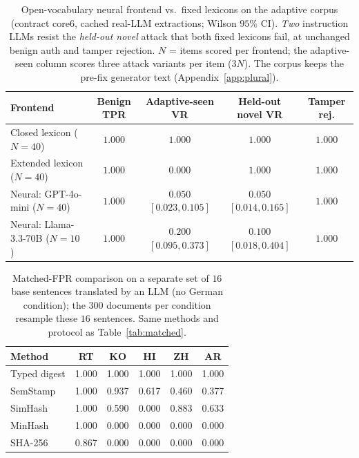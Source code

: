\documentclass[11pt]{article}
\begin{document}
\begin{table}[t]
\centering
\caption{Open-vocabulary neural frontend vs.\ fixed lexicons on the adaptive
corpus (contract core6, cached real-LLM extractions; Wilson $95\%$ CI). \emph{Two}
instruction LLMs resist the \emph{held-out novel} attack that both fixed lexicons
fail, at unchanged benign auth and tamper rejection. $N$ = items scored per
frontend; the adaptive-seen column scores three attack variants per item ($3N$). The corpus keeps the pre-fix generator text (Appendix~\ref{app:plural}).}
\label{tab:neuraldefense}
\footnotesize
\begin{tabular}{lcccc}
\toprule
Frontend & Benign TPR & Adaptive-seen VR & Held-out novel VR & Tamper rej. \\
\midrule
Closed lexicon ($N{=}40$)         & $1.000$ & $1.000$ & $1.000$ & $1.000$ \\
Extended lexicon ($N{=}40$)       & $1.000$ & $0.000$ & $1.000$ & $1.000$ \\
Neural: GPT-4o-mini ($N{=}40$)    & $1.000$ & $0.050$ $[0.023,0.105]$ & $0.050$ $[0.014,0.165]$ & $1.000$ \\
Neural: Llama-3.3-70B ($N{=}10$)  & $1.000$ & $0.200$ $[0.095,0.373]$ & $0.100$ $[0.018,0.404]$ & $1.000$ \\
\bottomrule
\end{tabular}
\end{table}

\begin{table}[t]
\centering
\caption{Matched-FPR comparison on a separate set of $16$ base sentences
translated by an LLM (no German condition); the $300$ documents per condition
resample these $16$ sentences. Same methods and protocol as Table~\ref{tab:matched}.}
\label{tab:matched16}
\footnotesize
\begin{tabular}{@{}lccccc@{}}
\toprule
Method & RT & KO & HI & ZH & AR \\
\midrule
Typed digest   & 1.000 & 1.000 & 1.000 & 1.000 & 1.000 \\
SemStamp       & 1.000 & 0.937 & 0.617 & 0.460 & 0.377 \\
SimHash        & 1.000 & 0.590 & 0.000 & 0.883 & 0.633 \\
MinHash        & 1.000 & 0.000 & 0.000 & 0.000 & 0.000 \\
SHA-256        & 0.867 & 0.000 & 0.000 & 0.000 & 0.000 \\
\bottomrule
\end{tabular}
\end{table}
\end{document}
